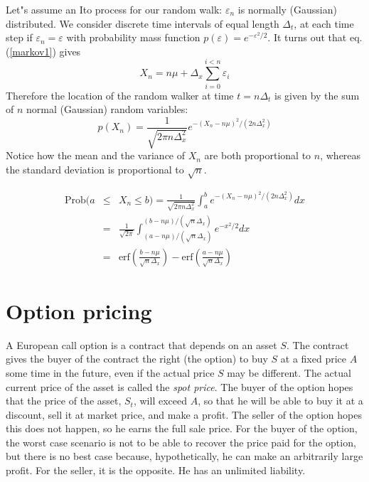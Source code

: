 \documentclass[justified, sixbynine]{tufte-book}
\theoremstyle{plain}%
\newtheorem * {corollary}{Corollary}
\theoremstyle{definition}
\theoremstyle{remark}
\newtheorem * {remark}{Remark}
\newtheorem * {note}{Note}
\begin{document}
\begin{fullwidth}
Let"s assume an Ito process for our random walk: $\varepsilon _n$ is normally
(Gaussian) distributed. We consider discrete time intervals of equal length $%
\Delta _t$, at each time step if $\varepsilon _n=\varepsilon $ with
probability mass function $p(\varepsilon )=e^{-\varepsilon ^2/2}$. It turns
out that eq.(\ref{markov1}) gives
\begin{equation}
X_n = n \mu + \Delta _x\sum_{i=0}^{i<n}\varepsilon _i
\end{equation}
Therefore the location of the random walker at time $t=n\Delta _t$ is given
by the sum of $n$ normal (Gaussian) random variables:
\begin{equation}
p(X_n)=\frac 1{\sqrt{2\pi n\Delta _x^2}}e^{-(X_n - n\mu)^2/(2n\Delta _x^2)}
\end{equation}
Notice how the mean and the variance of $X_n$ are both proportional
to $n$, whereas the standard deviation is proportional to $\sqrt{n}$.

\begin{eqnarray}
\textrm{Prob}(a &\leq &X_n\leq b)=\frac 1{\sqrt{2\pi n\Delta _x^2}}\int_a^be^{-(X_n - n\mu)^2/(2n%
\Delta _x^2)}dx \\
&=&\frac 1{\sqrt{2\pi }}\int_{(a-n\mu)/(\sqrt{n}\Delta _x)}^{(b-n\mu)/(\sqrt{n}\Delta
_x)}e^{-x^2/2}dx \\
&=&\textrm{erf}(\frac {b-n\mu}{\sqrt{n}\Delta _x})-\textrm{erf}(\frac {a-n\mu}{\sqrt{n}\Delta
_x})
\end{eqnarray}

\goodbreak\section{Option pricing}

A European call option is a contract that depends on an asset $S$. The contract gives the buyer of the contract the right (the option) to buy $S$ at a fixed price $A$ some time in the future, even if the actual price $S$ may be different. The actual current price of the asset is called the {\it spot price}. The buyer of the option hopes that the price of the asset, $S_t$, will exceed $A$, so that he will be able to buy it at a discount, sell it at market price, and make a profit. The seller of the option hopes this does not happen, so he earns the full sale price. For the buyer of the option, the worst case scenario is not to be able to recover the price paid for the option, but there is no best case because, hypothetically, he can make an arbitrarily large profit. For the seller, it is the opposite. He has an unlimited liability.


\end{fullwidth}
\end{document}
